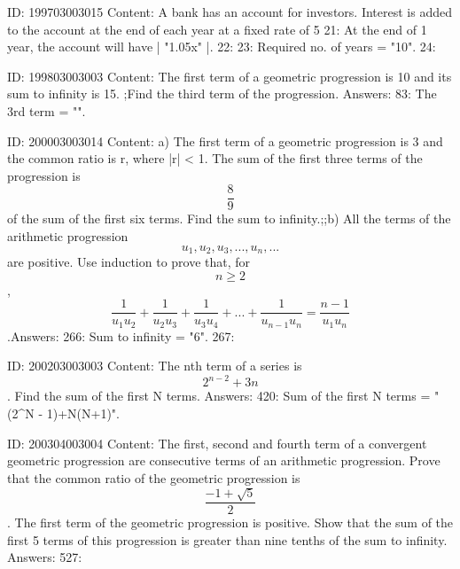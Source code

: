 \documentclass{article}
\begin{document}
ID: 199703003015
Content:
A bank has an account for investors. Interest is added to the account at the end of each year at a fixed rate of 5%
21: At the end of 1 year, the account will have | "1.05x" |.
22: 
23: Required no. of years = "10".
24: 

ID: 199803003003
Content:
The first term of a geometric progression is 10 and its sum to infinity is 15. ;Find the third term of the progression. Answers:
83: The 3rd term = "".

ID: 200003003014
Content:
a) The first term of a geometric progression is 3 and the common ratio is r, where |r| < 1. The sum of the first three terms of the progression is \[\frac{8}{9}\] of the sum of the first six terms. Find the sum to infinity.;;b) All the terms of the arithmetic progression \[u_{1}, u_{2}, u_{3},..., u_{n},...\] are positive. Use induction to prove that, for  \[n \geq 2\], \[\frac{1}{u_{1}u_{2}} + \frac{1}{u_{2}u_{3}} + \frac{1}{u_{3}u_{4}} + ... + \frac{1}{u_{n-1}u_{n}} = \frac{n - 1}{u_{1}u_{n}}\].Answers:
266: Sum to infinity = "6".
267: 

ID: 200203003003
Content:
The nth term of a series is  $$2^{n - 2}  + 3n$$. Find the sum of the first N terms. Answers:
420: Sum of the first N terms = "(2^N - 1)+N(N+1)".

ID: 200304003004
Content:
The first, second and fourth term of a convergent geometric progression are consecutive terms of an arithmetic progression. Prove that the common ratio of the geometric progression is  $$\frac{-1 + \sqrt 5}{2}$$. The first term of the geometric progression is positive. Show that the sum of the first 5 terms of this progression is greater than nine tenths of the sum to infinity.   Answers:
527: 
\end{document}

